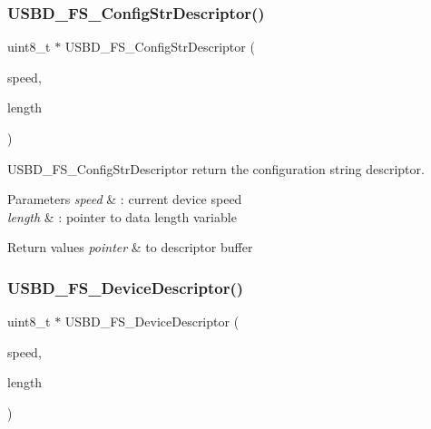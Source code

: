 \subsubsection{\texorpdfstring{U\+S\+B\+D\+\_\+\+F\+S\+\_\+\+Config\+Str\+Descriptor()}{USBD\_FS\_ConfigStrDescriptor()}}
{\footnotesize\ttfamily uint8\+\_\+t $\ast$ U\+S\+B\+D\+\_\+\+F\+S\+\_\+\+Config\+Str\+Descriptor (\begin{DoxyParamCaption}\item[{U\+S\+B\+D\+\_\+\+Speed\+Type\+Def}]{speed,  }\item[{uint16\+\_\+t $\ast$}]{length }\end{DoxyParamCaption})}



U\+S\+B\+D\+\_\+\+F\+S\+\_\+\+Config\+Str\+Descriptor return the configuration string descriptor. 


\begin{DoxyParams}{Parameters}
{\em speed} & \+: current device speed \\
\hline
{\em length} & \+: pointer to data length variable \\
\hline
\end{DoxyParams}

\begin{DoxyRetVals}{Return values}
{\em pointer} & to descriptor buffer \\
\hline
\end{DoxyRetVals}
\mbox{\label{group__USBD__DESC__Private__Functions_ga14798be38c08a37163e53167032485ff}} 
\subsubsection{\texorpdfstring{U\+S\+B\+D\+\_\+\+F\+S\+\_\+\+Device\+Descriptor()}{USBD\_FS\_DeviceDescriptor()}}
{\footnotesize\ttfamily uint8\+\_\+t $\ast$ U\+S\+B\+D\+\_\+\+F\+S\+\_\+\+Device\+Descriptor (\begin{DoxyParamCaption}\item[{U\+S\+B\+D\+\_\+\+Speed\+Type\+Def}]{speed,  }\item[{uint16\+\_\+t $\ast$}]{length }\end{DoxyParamCaption})}



